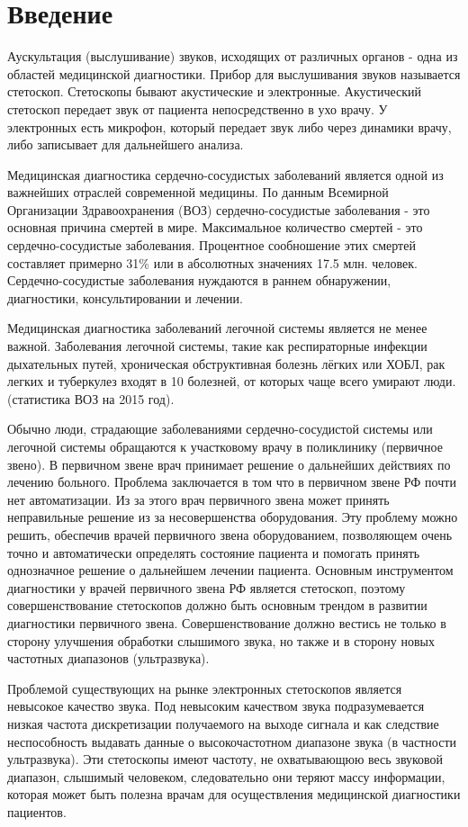 \documentclass[../main.tex]{subfiles}
\begin{document}
\section*{Введение}
%

Аускультация (выслушивание) звуков, исходящих от различных органов - одна из областей медицинской диагностики. Прибор для выслушивания звуков называется стетоскоп. Стетоскопы бывают акустические и электронные. Акустический стетоскоп передает звук от пациента непосредственно в ухо врачу. У электронных есть микрофон, который передает звук либо через динамики врачу, либо записывает для дальнейшего анализа.

Медицинская диагностика сердечно-сосудистых заболеваний является одной из важнейших отраслей современной медицины. По данным Всемирной Организации Здравоохранения (ВОЗ) сердечно-сосудистые заболевания - это основная причина смертей в мире. Максимальное количество смертей - это сердечно-сосудистые заболевания. Процентное сообношение этих смертей составляет примерно 31\% или в абсолютных значениях  17.5 млн. человек. Сердечно-сосудистые заболевания нуждаются в раннем обнаружении, диагностики, консультировании и лечении.

Медицинская диагностика заболеваний легочной системы является не менее важной. Заболевания легочной системы, такие как респираторные инфекции дыхательных путей, хроническая обструктивная болезнь лёгких или ХОБЛ, рак легких и туберкулез входят в 10 болезней, от которых чаще всего умирают люди. (статистика ВОЗ на 2015 год).

Обычно люди, страдающие заболеваниями сердечно-сосудистой системы или легочной системы обращаются к участковому врачу в поликлинику (первичное звено). В первичном звене врач принимает решение о дальнейших действиях по лечению больного. Проблема заключается в том что в первичном звене РФ почти нет автоматизации. Из за этого врач первичного звена может принять неправильные решение из за несовершенства оборудования. Эту проблему можно решить, обеспечив врачей первичного звена оборудованием, позволяющем очень точно и автоматически определять состояние пациента и помогать принять однозначное решение о дальнейшем лечении пациента. Основным инструментом диагностики у врачей первичного звена РФ является стетоскоп, поэтому совершенствование стетоскопов должно быть основным трендом в развитии диагностики первичного звена. Совершенствование должно вестись не только в сторону улучшения обработки слышимого звука, но также и в сторону новых частотных диапазонов (ультразвука).

Проблемой существующих на рынке электронных стетоскопов является невысокое качество звука. Под невысоким качеством звука подразумевается низкая частота дискретизации получаемого на выходе сигнала и как следствие неспособность выдавать данные о высокочастотном диапазоне звука (в частности ультразвука). Эти стетоскопы имеют частоту, не охватывающюю весь звуковой диапазон, слышимый человеком, следовательно они теряют массу информации, которая может быть полезна врачам для осуществления медицинской диагностики пациентов.
\newpage
\end{document}

